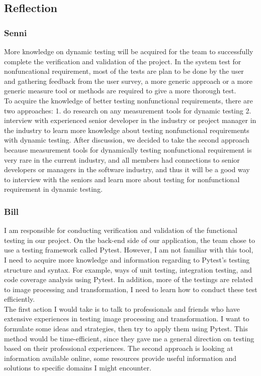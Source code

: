 \documentclass[12pt, titlepage]{article}
\begin{document}
\newpage{}
\subsection{Reflection}
\subsubsection{Senni}
More knowledge on dynamic testing will be acquired for the team to successfully complete the verification and validation of the project. In the system test for nonfuncational requirement, most of the tests are plan to be done by the user and gathering feedback from the user survey, a more generic approach or a more generic measure tool or methods are required to give a more thorough test.\\
\newline
To acquire the knowledge of better testing nonfunctional requirements, there are two approaches: 1. do research on any measurement tools for dynamic testing 2. interview with experienced senior developer in the industry or project manager in the industry to learn more knowledge about testing nonfunctional requirements with dynamic testing. After discussion, we decided to take the second approach because measurement tools for dynamically testing nonfunctional requirement is very rare in the current industry, and all members had connections to senior developers or managers in the software industry, and thus it will be a good way to interview with the seniors and learn more about testing for nonfunctional requirement in dynamic testing.

\subsubsection{Bill}
I am responsible for conducting verification and validation of the functional testing in our project. On the back-end side of our application, the team chose to use a testing framework called Pytest. However, I am not familiar with this tool, I need to acquire more knowledge and information regarding to Pytest's testing structure and syntax. For example, ways of unit testing, integration testing, and code coverage analysis using Pytest. In addition, more of the testings are related to image processing and transformation, I need to learn how to conduct these test efficiently.\\
\newline
The first action I would take is to talk to professionals and friends who have extensive experiences in testing image processing and transformation. I want to formulate some ideas and strategies, then try to apply them using Pytest. This method would be time-efficient, since they gave me a general direction on testing based on their professional experiences. The second approach is looking at information available online, some resources provide useful information and solutions to specific domains I might encounter.
\medskip
\end{document}
